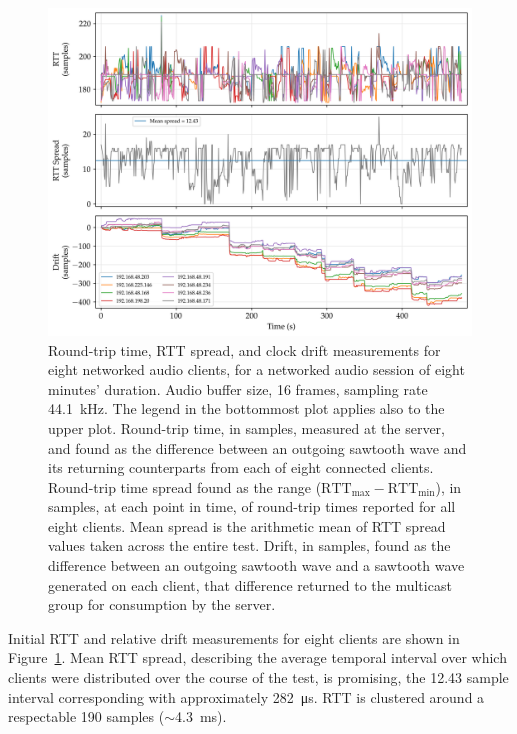 \documentclass[utf8]{FrontiersinHarvard}
\newcommand{\figref}[1]{Figure~\ref{#1}}
\begin{document}
    \begin{figure}[h]
        \centering
        \includegraphics[width=\textwidth]{figures/rtt_drift_16}
        \caption{
            Round-trip time, RTT spread, and clock drift measurements for eight
            networked audio clients, for a networked audio session of eight minutes'
            duration.
            Audio buffer size, 16 frames, sampling rate \qty{44.1}{\kHz}.
            The legend in the bottommost plot applies also to the upper plot.
            Round-trip time, in samples, measured at the server, and found as the
            difference between an outgoing sawtooth wave and its returning
            counterparts from each of eight connected clients.
            Round-trip time spread found as the range ($\text{RTT}_{\max} -
            \text{RTT}_{\min}$), in samples, at each point in time, of
            round-trip times reported for all eight clients.
            Mean spread is the arithmetic mean of RTT spread values taken across
            the entire test.
            Drift, in samples, found as the difference between an outgoing sawtooth
            wave and a sawtooth wave generated on each client, that difference
            returned to the multicast group for consumption by the server.
        }
        \label{fig:rtt-drift-16}
    \end{figure}

    Initial RTT and relative drift measurements for eight clients are shown in
    \figref{fig:rtt-drift-16}.
    Mean RTT spread, describing the average temporal interval over which clients
    were distributed over the course of the test, is promising, the 12.43 sample
    interval corresponding with approximately \qty{282}{\us}.
    RTT is clustered around a respectable 190 samples ($\sim$\qty{4.3}{\ms}).
\end{document}
